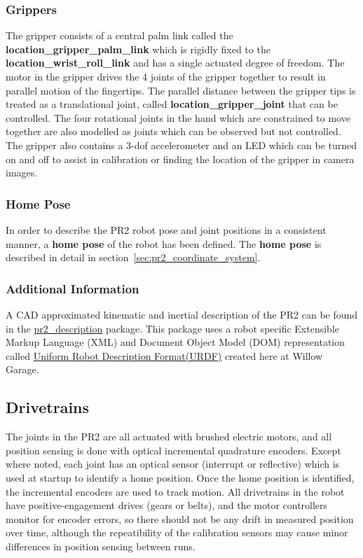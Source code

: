 \subsubsection{Grippers}
The gripper consists of a central palm link called the {\bf location\_gripper\_palm\_link} which is rigidly fixed to the {\bf location\_wrist\_roll\_link} and has a single actuated degree of freedom.  The motor in the gripper drives the 4 joints of the gripper together to result in parallel motion of the fingertips.  The parallel distance between the gripper tips is treated as a translational joint, called {\bf location\_gripper\_joint} that can be controlled.  The four rotational joints in the hand which are constrained to move together are also modelled as joints which can be observed but not controlled.  The gripper also contains a 3-dof accelerometer and an LED which can be turned on and off to assist in calibration or finding the location of the gripper in camera images.

\subsubsection{Home Pose}
In order to describe the PR2 robot pose and joint positions in a consistent manner, a {\bf home pose} of the robot has been defined.  The {\bf home pose} is described in detail in section~\ref{sec:pr2_coordinate_system}.

\subsubsection{Additional Information}
A CAD approximated kinematic and inertial description of the PR2 can be found
  in the \href{http://www.ros.org/wiki/pr2\_description}{pr2\_description} package.
This package uses a robot specific Extensible Markup Language (XML) and Document Object Model (DOM) representation
  called \href{http://www.ros.org/wiki/urdf}{Uniform Robot Description Format(URDF)} created here at Willow Garage.


\subsection{Drivetrains}
The joints in the PR2 are all actuated with brushed electric motors, and all position sensing is done with optical incremental quadrature encoders.  Except where noted, each joint has an optical sensor (interrupt or reflective) which is used at startup to identify a home position.  Once the home position is identified, the incremental encoders are used to track motion.  All drivetrains in the robot have positive-engagement drives (gears or belts), and the motor controllers monitor for encoder errors, so there should not be any drift in measured position over time, although the repeatibility of the calibration sensors may cause minor differences in position sensing between runs.


